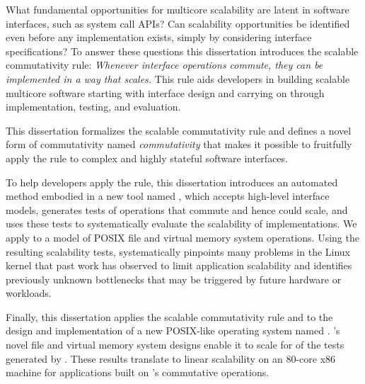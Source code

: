What fundamental opportunities for multicore scalability are latent in
software interfaces, such as system call APIs? Can scalability
opportunities be identified even before any implementation exists,
simply by considering interface specifications?
To answer these
questions this dissertation introduces the scalable commutativity rule:
\emph{Whenever interface operations commute,
they can be implemented in a way that scales.}
This rule aids developers in building scalable multicore software
starting with interface design and
carrying on through implementation, testing, and evaluation.

This dissertation formalizes the scalable commutativity rule and
defines a novel form of commutativity named \emph{\SIM commutativity}
that makes it possible to fruitfully apply the rule to complex and
highly stateful software interfaces.

To help developers apply the rule, this dissertation introduces an
automated method embodied in a new tool named \tool, which accepts
high-level interface models, generates tests of operations that
commute and hence could scale, and uses these tests to systematically
evaluate the scalability of implementations.
%
We apply \tool to a model of  POSIX file and
virtual memory system operations.
%
Using the resulting  scalability tests, \tool
systematically pinpoints many problems in the Linux kernel that past
work has observed to limit application scalability and identifies
previously unknown bottlenecks that may be triggered by future
hardware or workloads.

Finally, this dissertation applies the scalable commutativity rule and
\tool to the design and implementation of a new POSIX-like operating
system named \sys.
%
\sys's novel file and virtual memory system designs enable it to scale
for  of
the tests generated by \tool.
%
These results translate to linear scalability on an 80-core x86
machine for applications built on \sys's commutative operations.
